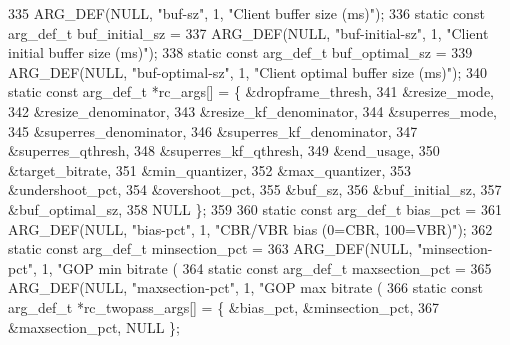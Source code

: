 \begin{DoxyCodeInclude}
{{{{{335     ARG\_DEF(NULL, \textcolor{stringliteral}{"buf-sz"}, 1, \textcolor{stringliteral}{"Client buffer size (ms)"});
336 \textcolor{keyword}{static} \textcolor{keyword}{const} arg\_def\_t buf\_initial\_sz =
337     ARG\_DEF(NULL, \textcolor{stringliteral}{"buf-initial-sz"}, 1, \textcolor{stringliteral}{"Client initial buffer size (ms)"});
338 \textcolor{keyword}{static} \textcolor{keyword}{const} arg\_def\_t buf\_optimal\_sz =
339     ARG\_DEF(NULL, \textcolor{stringliteral}{"buf-optimal-sz"}, 1, \textcolor{stringliteral}{"Client optimal buffer size (ms)"});
340 \textcolor{keyword}{static} \textcolor{keyword}{const} arg\_def\_t *rc\_args[] = \{ &dropframe\_thresh,
341                                       &resize\_mode,
342                                       &resize\_denominator,
343                                       &resize\_kf\_denominator,
344                                       &superres\_mode,
345                                       &superres\_denominator,
346                                       &superres\_kf\_denominator,
347                                       &superres\_qthresh,
348                                       &superres\_kf\_qthresh,
349                                       &end\_usage,
350                                       &target\_bitrate,
351                                       &min\_quantizer,
352                                       &max\_quantizer,
353                                       &undershoot\_pct,
354                                       &overshoot\_pct,
355                                       &buf\_sz,
356                                       &buf\_initial\_sz,
357                                       &buf\_optimal\_sz,
358                                       NULL \};
359 
360 \textcolor{keyword}{static} \textcolor{keyword}{const} arg\_def\_t bias\_pct =
361     ARG\_DEF(NULL, \textcolor{stringliteral}{"bias-pct"}, 1, \textcolor{stringliteral}{"CBR/VBR bias (0=CBR, 100=VBR)"});
362 \textcolor{keyword}{static} \textcolor{keyword}{const} arg\_def\_t minsection\_pct =
363     ARG\_DEF(NULL, \textcolor{stringliteral}{"minsection-pct"}, 1, \textcolor{stringliteral}{"GOP min bitrate (%
364 \textcolor{keyword}{static} \textcolor{keyword}{const} arg\_def\_t maxsection\_pct =
365     ARG\_DEF(NULL, \textcolor{stringliteral}{"maxsection-pct"}, 1, \textcolor{stringliteral}{"GOP max bitrate (%
366 \textcolor{keyword}{static} \textcolor{keyword}{const} arg\_def\_t *rc\_twopass\_args[] = \{ &bias\_pct, &minsection\_pct,
367                                               &maxsection\_pct, NULL \};
}}}}}}}
\end{DoxyCodeInclude}
